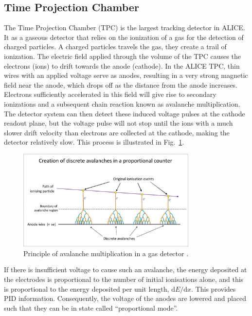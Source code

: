 \subsection{Time Projection Chamber}
\label{sec:TPC}

The Time Projection Chamber (TPC) is the largest tracking detector in ALICE. It as a gaseous detector that relies on the ionization of a gas for the detection of charged particles. A charged particles travels the gas, they create a trail of ionization. The electric field applied through the volume of the TPC causes the electrons (ions) to drift towards the anode (cathode). In the ALICE TPC, thin wires with an applied voltage serve as anodes, resulting in a very strong magnetic field near the anode, which drops off as the distance from the anode increases. Electrons sufficiently accelerated in this field will give rise to secondary ionizations and a subsequent chain reaction known as avalanche multiplication. The detector system can then detect these induced voltage pulses at the cathode readout plane, but the voltage pulse will not stop until the ions with a much slower drift velocity than electrons are collected at the cathode, making the detector relatively slow. This process is illustrated in Fig.~\ref{fig:tpc_avalanche}.

\begin{figure}[htpb]
  \centering
  \includegraphics[width=0.8\textwidth]{Experimental_Aparatus/Proportional_counter.jpg}
  \caption{Principle of avalanche multiplication in a gas detector \cite{Dougsim2012}.}
  \label{fig:tpc_avalanche}
\end{figure}

If there is insufficient voltage to cause such an avalanche, the energy deposited at the electrodes is proportional to the number of initial ionisations alone, and this is proportional to the energy deposited per unit length, $\text{d}E/\text{d}x$. This provides PID information. Consequently, the voltage of the anodes are lowered and placed such that they can be in state called ``proportional mode''.

